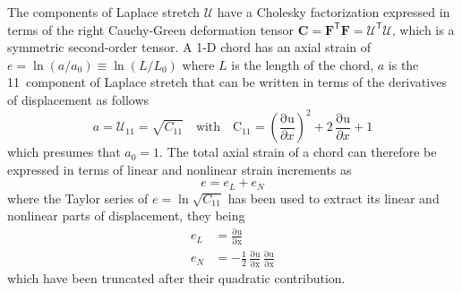 The components of Laplace stretch $\boldsymbol{\mathcal{U}}$ have a Cholesky factorization expressed in terms of the right Cauchy-Green deformation tensor $\mathbf{C} = \mathbf{F}^{\mathsf{T}} \mathbf{F} = \boldsymbol{\mathcal{U}}^{\mathsf{T}} \boldsymbol{\mathcal{U}}$, which is a symmetric second-order tensor.  A 1-D chord has an axial strain of $e = \ln ( a / a_0 ) \equiv \ln ( L / L_0 )$ where $L$ is the length of the chord, $a$ is the 11~component of Laplace stretch that can be written in terms of the derivatives of displacement as follows
\begin{equation}
a = {\mathcal{U}}_{11} = \sqrt{C_{11}}  \quad \text{with} \quad \mathrm{C_{11}} = \left(\frac{\mathrm{\partial u}}{\partial x}\right)^2 + 2\, \frac{\mathrm{\partial u}}{\partial x}  + 1
\end{equation} 
which presumes that $a_0 = 1$.  The total axial strain of a chord can therefore be expressed in terms of linear and nonlinear strain increments as
\begin{equation}
 e = e_{L} + e_{N} 
\end{equation}
where the Taylor series of $e = \ln \sqrt{C_{11}}$ has been used to extract its linear and nonlinear parts of displacement, they being
\begin{subequations}
	\begin{align}
	e_{L} & = \mathrm{\frac{\partial u}{\partial x}} \\
	e_{N} & = -\frac{1}{2} \, \mathrm{\frac{\partial u}{\partial x}}\, \mathrm{\frac{\partial u}{\partial x}}
	\end{align}
\end{subequations}
which have been truncated after their quadratic contribution.

